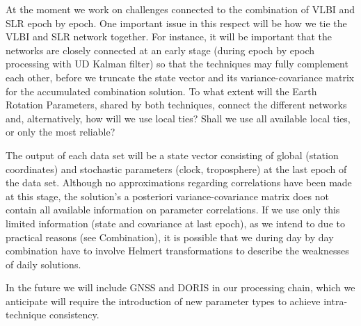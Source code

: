 At the moment we work on challenges connected to the combination of VLBI and SLR epoch by epoch. One important issue in this respect will be how we tie the VLBI and SLR network together. For instance, it will be important that the networks are closely connected at an early stage (during epoch by epoch processing with UD Kalman filter) so that the techniques may fully complement each other, before we truncate the state vector and its variance-covariance matrix for the accumulated combination solution. To what extent will the Earth Rotation Parameters, shared by both techniques, connect the different networks and, alternatively, how will we use local ties? Shall we use all available local ties, or only the most reliable?

The output of each data set will be a state vector consisting of global (station coordinates) and stochastic parameters (clock, troposphere) at the last epoch of the data set. Although no approximations regarding correlations have been made at this stage, the solution's a posteriori variance-covariance matrix does not contain all available information on parameter correlations. If we use only this limited information (state and covariance at last epoch), as we intend to due to practical reasons (see Combination), it is possible that we during day by day combination have to involve Helmert transformations to describe the weaknesses of daily solutions.       

In the future we will include GNSS and DORIS in our processing chain, which we anticipate will require the introduction of new parameter types to achieve intra-technique consistency.    


\endinput
